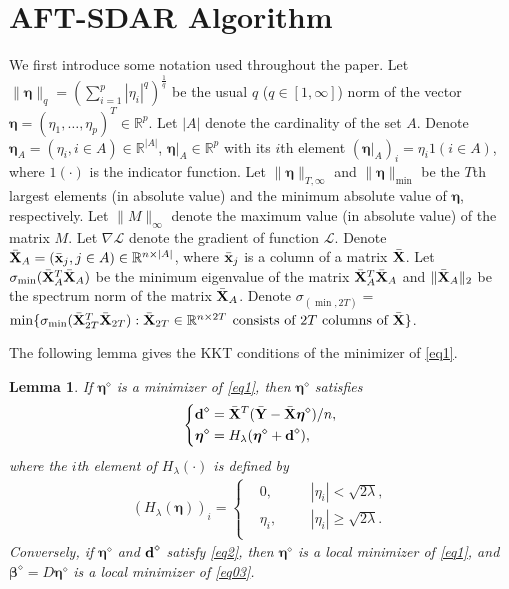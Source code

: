 \documentclass[12pt]{article}
\newtheorem{lemma}{Lemma}
\newcommand{\bX}{{\bf X}}
\newcommand{\bx}{\mbox{\bf x}}
\newcommand{\bd}{\mbox{\bf d}}
\newcommand{\bY}{\mbox{\bf Y}}
\newcommand{\bbeta}{\boldsymbol{\beta}}
\newcommand{\boldeta}{\boldsymbol{\eta}}
\begin{document}
\section{AFT-SDAR Algorithm}
\label{sec:1}
We first introduce some notation used throughout the paper.
Let $\|\boldeta\|_q=(\sum_{i=1}^{p}|\eta_{i}|^q)^{\frac{1}{q}}$ be the usual $q$ ($q\in [1,\infty]$) norm
of the vector $\boldeta=(\eta_1,\ldots,\eta_p)^{T}\in \mathbb{R}^{p}$.
Let $|A|$ denote the cardinality of the set $A$. Denote $\boldeta_A=(\eta_i,i\in A)\in \mathbb{R}^{|A|}$, $\boldeta|_A\in \mathbb{R}^{p}$ with its $i$th element $({\boldeta|_A})_i=\eta_i\text{1}(i\in A)$, where $\text{1}(\cdot)$ is the indicator function. Let
$\|\boldeta\|_{T,\infty}$ and $\|\boldeta\|_{\min}$
be the $T$th largest elements (in absolute value) and the minimum absolute value of $\boldeta$, respectively. Let $\|M\|_{\infty}$ denote the maximum value (in absolute value) of the matrix $M$. Let $\nabla  \mathcal{L}$ denote the gradient of
function $\mathcal{L}$. Denote $\bar{\bX}_A=(\bar{\bx}_j,j\in A)\in \mathbb{R}^{n\times |A|}$, where $\bar{\bx}_j$ is a column of a matrix $\bar{\bX}$. Let $\sigma_{\min}(\bar{\bX}_A^T\bar{\bX}_A)$ be the minimum eigenvalue of the matrix $\bar{\bX}_A^T\bar{\bX}_A$ and $\|\bar{\bX}_A\|_2$ be the spectrum norm of the matrix $\bar{\bX}_A$.
{Denote
$\sigma_{(\min,2T)}
=$$\min\{\sigma_{\min}(\bar{\bX}_{2T}^T\bar{\bX}_{2T}): \bar{\bX}_{2T}\in \mathbb{R}^{n\times 2T}$
$\mbox{consists}~ \mbox{of}~2T~\mbox{columns}~\mbox{of}~ \bar{\bX}\}$.}


The following lemma gives the KKT conditions of the minimizer of \eqref{eq1}.
\begin{lemma}\label{L1}
If $\boldeta^\diamond$ is a minimizer of \eqref{eq1}, then $\boldeta^\diamond$ satisfies
\begin{align}\label{eq2}
\left\{
\begin{aligned}
&\bd^{\diamond}=\bar{\bX}^{T}(\bar{\bY}-\bar{\bX}\boldeta^{\diamond})/n,\\
&\boldeta^{\diamond}=H_{\lambda}(\boldeta^{\diamond}+\bd^{\diamond}), \\
\end{aligned}
\right.
\end{align}
where the $i$th element of $H_{\lambda}(\cdot)$ is defined by
\begin{align}\label{eq3}
 (H_{\lambda}(\boldeta))_{i}=\left\{
\begin{aligned}
&0  ,&&&|\eta_{i}|<\sqrt{2\lambda},\\
&\eta_{i}  ,&&&|\eta_{i}|\geq\sqrt{2\lambda}.\\
\end{aligned}\right.
\end{align}
Conversely, if $\boldeta^{\diamond}$ and $\bd^{\diamond}$ satisfy \eqref{eq2}, then $\boldeta^{\diamond}$ is a local minimizer of \eqref{eq1}, and
$\bbeta^{\diamond}=D\boldeta^{\diamond}$ is a local minimizer of \eqref{eq03}.
\end{lemma}
\end{document}
